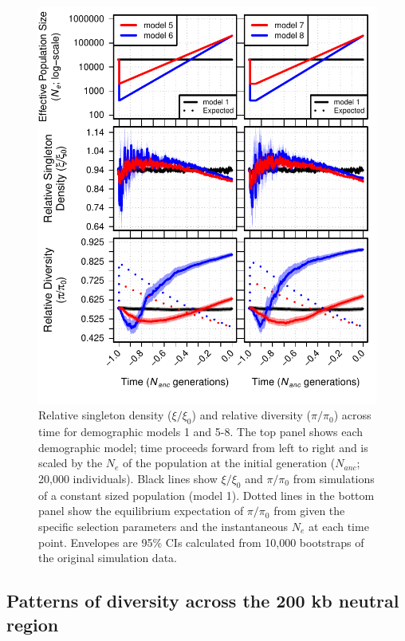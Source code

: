 \documentclass[9pt,twocolumn,twoside]{rilabRxiv}
\begin{document}
\begin{figure}[]
\includegraphics[width=\linewidth]{figures/fig3newclean.pdf}
\caption{Relative singleton density ($\xi/\xi_0$) and relative diversity ($\pi/\pi_0$) across time for demographic models 1 and 5-8.
The top panel shows each demographic model; time proceeds forward from left to right and is scaled by the $N_e$ of the population at the initial generation ($N_{anc}$; 20,000 individuals).
Black lines show $\xi/\xi_0$ and $\pi/\pi_0$ from simulations of a constant sized population (model 1).
Dotted lines in the bottom panel show the equilibrium expectation of $\pi/\pi_0$ from  \citet{nordborg1996effect} given the specific selection parameters and the instantaneous $N_e$ at each time point.
Envelopes are 95\% CIs calculated from 10,000 bootstraps of the original simulation data.}
\label{fig:3new}
\end{figure}

\subsection{Patterns of diversity across the 200 kb neutral region}
\end{document}
